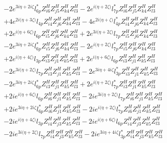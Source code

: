 \begin{align}
 &-2 e^{3 i \eta +2 i \zeta } l_{6p}^* Z_{{i 6}}^{H} Z_{{j 5}}^{H} Z_{{k 4}}^{H} Z_{{l 3}}^{H} -2 e^{i \Big(\eta +2 \zeta \Big)} l_{7p}^* Z_{{i 6}}^{H} Z_{{j 5}}^{H} Z_{{k 4}}^{H} Z_{{l 3}}^{H} \nonumber \\ 
 &+4 e^{2 i \Big(\eta +3 \zeta \Big)} l_{4p} Z_{{i 4}}^{H} Z_{{j 6}}^{H} Z_{{k 4}}^{H} Z_{{l 3}}^{H} -4 e^{2 i \Big(\eta +\zeta \Big)} l_{4p}^* Z_{{i 4}}^{H} Z_{{j 6}}^{H} Z_{{k 4}}^{H} Z_{{l 3}}^{H} \nonumber \\ 
 &+2 e^{i \Big(\eta +6 \zeta \Big)} l_{6p} Z_{{i 5}}^{H} Z_{{j 6}}^{H} Z_{{k 4}}^{H} Z_{{l 3}}^{H} +2 e^{3 i \Big(\eta +2 \zeta \Big)} l_{7p} Z_{{i 5}}^{H} Z_{{j 6}}^{H} Z_{{k 4}}^{H} Z_{{l 3}}^{H} \nonumber \\ 
 &-2 e^{3 i \eta +2 i \zeta } l_{6p}^* Z_{{i 5}}^{H} Z_{{j 6}}^{H} Z_{{k 4}}^{H} Z_{{l 3}}^{H} -2 e^{i \Big(\eta +2 \zeta \Big)} l_{7p}^* Z_{{i 5}}^{H} Z_{{j 6}}^{H} Z_{{k 4}}^{H} Z_{{l 3}}^{H} \nonumber \\ 
 &+2 e^{i \Big(\eta +4 \zeta \Big)} l_{3p} Z_{{i 3}}^{H} Z_{{j 1}}^{H} Z_{{k 5}}^{H} Z_{{l 3}}^{H} +2 e^{i \Big(\eta +6 \zeta \Big)} l_{6p} Z_{{i 3}}^{H} Z_{{j 1}}^{H} Z_{{k 5}}^{H} Z_{{l 3}}^{H} \nonumber \\ 
 &-2 e^{3 i \Big(\eta +2 \zeta \Big)} l_{7p} Z_{{i 3}}^{H} Z_{{j 1}}^{H} Z_{{k 5}}^{H} Z_{{l 3}}^{H} -2 e^{3 i \eta +4 i \zeta } l_{3p}^* Z_{{i 3}}^{H} Z_{{j 1}}^{H} Z_{{k 5}}^{H} Z_{{l 3}}^{H} \nonumber \\ 
 &-2 e^{3 i \eta +2 i \zeta } l_{6p}^* Z_{{i 3}}^{H} Z_{{j 1}}^{H} Z_{{k 5}}^{H} Z_{{l 3}}^{H} +2 e^{i \Big(\eta +2 \zeta \Big)} l_{7p}^* Z_{{i 3}}^{H} Z_{{j 1}}^{H} Z_{{k 5}}^{H} Z_{{l 3}}^{H} \nonumber \\ 
 &+2 i e^{i \Big(\eta +6 \zeta \Big)} l_{6p} Z_{{i 6}}^{H} Z_{{j 1}}^{H} Z_{{k 5}}^{H} Z_{{l 3}}^{H} -2 i e^{3 i \Big(\eta +2 \zeta \Big)} l_{7p} Z_{{i 6}}^{H} Z_{{j 1}}^{H} Z_{{k 5}}^{H} Z_{{l 3}}^{H} \nonumber \\ 
 &+2 i e^{3 i \eta +2 i \zeta } l_{6p}^* Z_{{i 6}}^{H} Z_{{j 1}}^{H} Z_{{k 5}}^{H} Z_{{l 3}}^{H} -2 i e^{i \Big(\eta +2 \zeta \Big)} l_{7p}^* Z_{{i 6}}^{H} Z_{{j 1}}^{H} Z_{{k 5}}^{H} Z_{{l 3}}^{H} \nonumber \\ 
 &-2 i e^{i \Big(\eta +4 \zeta \Big)} l_{3p} Z_{{i 4}}^{H} Z_{{j 3}}^{H} Z_{{k 5}}^{H} Z_{{l 3}}^{H} -2 i e^{i \Big(\eta +6 \zeta \Big)} l_{6p} Z_{{i 4}}^{H} Z_{{j 3}}^{H} Z_{{k 5}}^{H} Z_{{l 3}}^{H} \nonumber \\ 
 &-2 i e^{3 i \Big(\eta +2 \zeta \Big)} l_{7p} Z_{{i 4}}^{H} Z_{{j 3}}^{H} Z_{{k 5}}^{H} Z_{{l 3}}^{H} -2 i e^{3 i \eta +4 i \zeta } l_{3p}^* Z_{{i 4}}^{H} Z_{{j 3}}^{H} Z_{{k 5}}^{H} Z_{{l 3}}^{H} \nonumber \\ 

\end{align}
